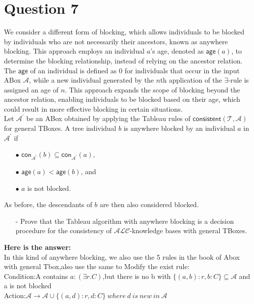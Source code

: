 \documentclass{article}
\begin{document}
    \section{Question 7}
    We consider a different form of blocking, which allows individuals to be blocked by individuals who are not necessarily their ancestors, known as anywhere blocking. This approach employs an individual $a$'s age, denoted as $\textsf{age}(a)$, to determine the blocking relationship, instead of relying on the ancestor relation.\\
    The $\textsf{age}$ of an individual is defined as $0$ for individuals that occur in the input ABox $\mathcal{A}$, while a new individual generated by the $n$th application of the $\exists$-rule is assigned an age of $n$. This approach expands the scope of blocking beyond the ancestor relation, enabling individuals to be blocked based on their age, which could result in more effective blocking in certain situations.\\
    Let $\mathcal{A}^{\prime}$ be an ABox obtained by applying the Tableau rules of $\textsf{consistent}(\mathcal{T}, \mathcal{A})$ for general TBoxes. A tree individual $b$ is anywhere blocked by an individual $a$ in $\mathcal{A}^{\prime}$ if
    \begin{itemize}
        \item[$\bullet$] $\textsf{con}_{\mathcal{A}^{\prime}}(b)\subseteq\textsf{con}_{\mathcal{A}^{\prime}}(a)$,
        \item[$\bullet$] $\textsf{age}(a)<\textsf{age}(b)$, and
        \item[$\bullet$] $a$ is not blocked.
    \end{itemize}
    As before, the descendants of $b$ are then also considered blocked.
    \begin{itemize}
        \item[-] Prove that the Tableau algorithm with anywhere blocking is a decision procedure for the consistency of $\mathcal{ALC}$-knowledge bases with general TBoxes. 
    \end{itemize}
    \textbf{Here is the answer:}\\
    In this kind of anywhere blocking, we also use the 5 rules in the book of Abox with general Tbox,also use the same to Modify the exist rule:\\
    Condition:A contains $a:(\exists r.C)$,but there is no b with $\{(a,b):r,b:C\}\subseteq\mathcal{A}$ and a is not blocked\\
    Action:$\mathcal{A}\rightarrow \mathcal{A} \cup \{(a,d):r,d:C\}\ where\ d\ is\ new\ in\ \mathcal{A}$\\
\end{document}
